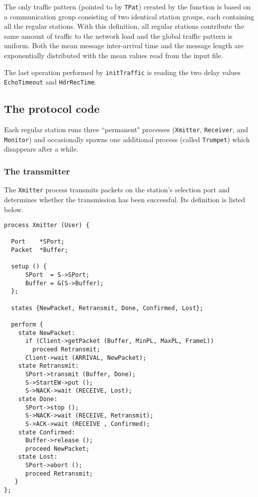 The only traffic pattern (pointed to by {\tt TPat}) created by the function
is based on a communication group consisting of two identical station groups,
each containing all the regular stations.
With this definition, all regular stations contribute the same amount of
traffic to the network load and the global traffic pattern is uniform.
Both the mean message inter-arrival time and the message length are
exponentially distributed with the mean values read from the input file.

The last operation performed by {\tt initTraffic} is reading the two delay values
{\tt EchoTimeout} and {\tt HdrRecTime}.

\subsection{The protocol code}

Each regular station runs three ``permanent" processes ({\tt Xmitter},
{\tt Receiver}, and {\tt Monitor}) and occasionally
spawns one additional process (called {\tt Trumpet})
which disappears after a while.

\subsubsection{The transmitter}

The {\tt Xmitter} process transmits packets on the station's selection port
and determines whether the transmission has been successful.
Its definition is listed below.
{\small
\begin{verbatim}
process Xmitter (User) {

  Port    *SPort;
  Packet  *Buffer;

  setup () {
      SPort  = S->SPort;
      Buffer = &(S->Buffer);
  };

  states {NewPacket, Retransmit, Done, Confirmed, Lost};

  perform {
    state NewPacket:
      if (Client->getPacket (Buffer, MinPL, MaxPL, FrameL))
        proceed Retransmit;
      Client->wait (ARRIVAL, NewPacket);
    state Retransmit:
      SPort->transmit (Buffer, Done);
      S->StartEW->put ();
      S->NACK->wait (RECEIVE, Lost);
    state Done:
      SPort->stop ();
      S->NACK->wait (RECEIVE, Retransmit);
      S->ACK->wait (RECEIVE , Confirmed);
    state Confirmed:
      Buffer->release ();
      proceed NewPacket;
    state Lost:
      SPort->abort ();
      proceed Retransmit;
   }
};
\end{verbatim} }

